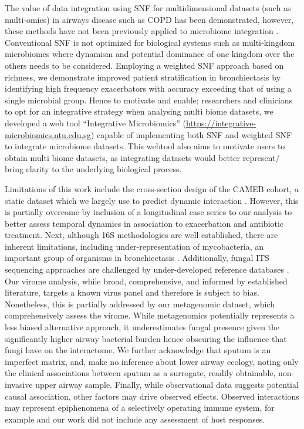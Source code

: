 The value of data integration using SNF for multidimensional datasets (such as multi-omics) in airways disease such as COPD has been demonstrated, however, these methods have not been previously applied to microbiome integration \cite{Li2018}. Conventional SNF is not optimized for biological systems such as multi-kingdom microbiomes where dynamism and potential dominance of one kingdom over the others needs to be considered. Employing a weighted SNF approach based on richness, we demonstrate improved patient stratification in bronchiectasis by identifying high frequency exacerbators with accuracy exceeding that of using a single microbial group. Hence to motivate and enable; researchers and clinicians to opt for an integrative strategy when analysing multi biome datasets, we developed a web tool “Integrative Microbiomics” (\url{https://integrative-microbiomics.ntu.edu.sg}) capable of implementing both SNF and weighted SNF to integrate microbiome datasets. This webtool also aims to motivate users to obtain multi biome datasets, as integrating datasets would better represent/ bring clarity to the underlying biological process. 

Limitations of this work include the cross-section design of the CAMEB cohort, a static dataset which we largely use to predict dynamic interaction \cite{Aogain2019,Mac1800766}. However, this is partially overcome by inclusion of a longitudinal case series to our analysis to better assess temporal dynamics in association to exacerbation and antibiotic treatment. Next, although 16S methodologies are well established, there are inherent limitations, including under-representation of mycobacteria, an important group of organisms in bronchiectasis \cite{Sulaiman2018}. Additionally, fungal ITS sequencing approaches are challenged by under-developed reference databases \cite{Ali2019}. Our virome analysis, while broad, comprehensive, and informed by established literature, targets a known virus panel and therefore is subject to bias. Nonetheless, this is partially addressed by our metagenomic dataset, which comprehensively assess the virome. While metagenomics potentially represents a less biased alternative approach, it underestimates fungal presence given the significantly higher airway bacterial burden hence obscuring the influence that fungi have on the interactome. We further acknowledge that sputum is an imperfect matrix, and, make no inference about lower airway ecology, noting only the clinical associations between sputum as a surrogate, readily obtainable, non-invasive upper airway sample. Finally, while observational data suggests potential causal association, other factors may drive observed effects. Observed interactions may represent epiphenomena of a selectively operating immune system, for example and our work did not include any assessment of host responses.